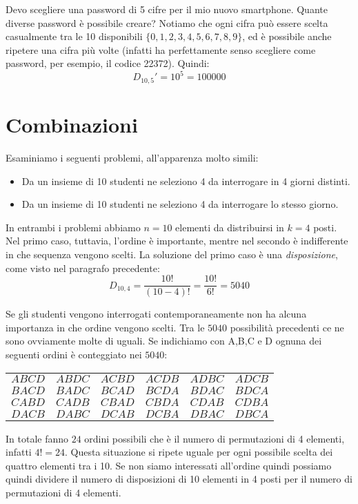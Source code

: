 \begin{esempio}
Devo scegliere una password di 5 cifre per il mio nuovo smartphone.
Quante diverse password è possibile creare? Notiamo che ogni cifra può essere scelta casualmente
tra le 10 disponibili $\{0,1,2,3,4,5,6,7,8,9\}$, ed è possibile anche ripetere una cifra più volte (infatti
ha perfettamente senso scegliere come password, per esempio, il codice 22372). Quindi:
\[D_{10,5}' = 10^5 = 100000\]

\end{esempio}

\section{Combinazioni}
\label{sec:04_combinazioni}
Esaminiamo i seguenti problemi, all'apparenza molto simili:
\begin{itemize}
\item Da un insieme di 10 studenti ne seleziono 4 da interrogare in 4 giorni distinti.
\item Da un insieme di 10 studenti ne seleziono 4 da interrogare lo stesso giorno.
\end{itemize}
In entrambi i problemi abbiamo $n=10$ elementi da distribuirsi in $k=4$ posti. 
Nel primo caso, tuttavia, l'ordine è importante, mentre nel secondo 
è indifferente in che sequenza vengono scelti.
La soluzione del primo caso è una \emph{disposizione}, come visto nel paragrafo 
precedente:
$$D_{10,4} = \dfrac{10!}{(10-4)!}=\dfrac{10!}{6!}=5040$$

Se gli studenti vengono interrogati contemporaneamente non ha alcuna importanza 
in che ordine vengono scelti. 
Tra le $5040$ possibilità precedenti ce ne sono ovviamente molte di uguali. Se 
indichiamo con A,B,C e D ognuna dei seguenti ordini è conteggiato nei $5040$:
\begin{center}
\begin{tabular}{cccccc}
$A B C D$ & $A B D C$ & $A C B D$ & $A C D B$ & $A D B C $ & $A D C B$\\
$B A C D$ & $B A D C$ & $B C A D$ & $B C D A$ & $B D A C $ & $B D C A$\\
$C A B D$ & $C A D B$ & $C B A D$ & $C B D A$ & $C D A B $ & $C D B A$\\
$D A C B$ & $D A B C$ & $D C A B$ & $D C B A$ & $D B A C $ & $D B C A$\\
\end{tabular}
\end{center}
In totale fanno $24$ ordini possibili che è il numero di permutazioni di 4 
elementi, infatti $4!=24$. Questa situazione si ripete uguale per ogni 
possibile scelta dei quattro elementi tra i 10. Se non siamo interessati 
all'ordine quindi possiamo quindi dividere il numero di disposizioni di 10 
elementi in 4 posti per il numero di permutazioni di 4 elementi.

